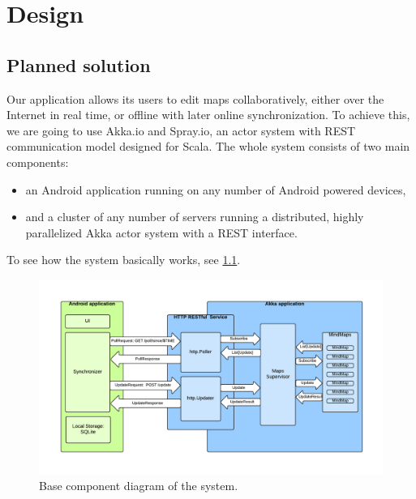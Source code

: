 %
%
%
%
%

\chapter{Design}
\label{chap:project}



\section{Planned solution}
\label{sec:plan}

Our application allows its users to edit maps collaboratively, either over the Internet in real time, or offline with later online synchronization. To achieve this, we are going to use Akka.io and Spray.io, an actor system with REST communication model designed for Scala. The whole system consists of two main components:

\begin{itemize}
	\item an Android application running on any number of Android powered devices,
	\item and a cluster of any number of servers running a distributed, highly parallelized Akka actor system with a REST interface.
\end{itemize}

To see how the system basically works, see \cref{fig:diagram-components-system}.

\begin{figure}[h]
	\centering
	\includegraphics[width=\textwidth]{component-diagram}
	\caption{Base component diagram of the system.}
	\label{fig:diagram-components-system}
\end{figure}

